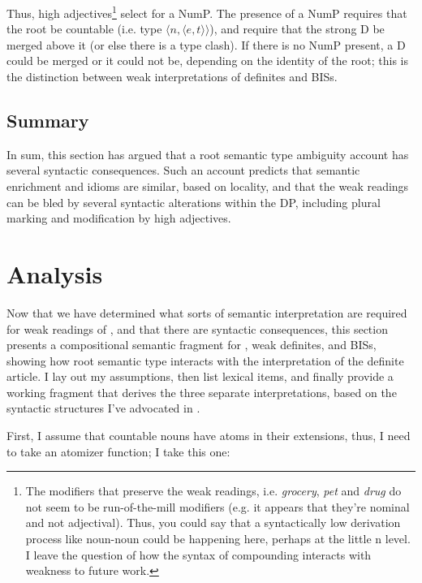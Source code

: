 \documentclass[output=paper,
modfonts
]{langscibook}
\begin{document}
Thus, high adjectives\footnote{The modifiers that preserve the weak readings, i.e. \textit{grocery}, \textit{pet} and \textit{drug} do not seem to be run-of-the-mill
modifiers (e.g. it appears that they’re nominal and not adjectival). Thus, you could say that a syntactically low derivation process like noun-noun  could be happening here, perhaps at the little n level. I leave the question of how the syntax of compounding interacts with weakness to future work.} select for a NumP. The presence of a NumP requires that the root be countable (i.e. type $\langle n, \langle e,t \rangle \rangle$), and  require that the strong D be merged above it (or else there is a type clash). If there is no NumP present, a D could be merged or it could not be, depending on the identity of the root; this is the distinction between weak interpretations of definites and BISs. 

\subsection{Summary}

In sum, this section has argued that a root semantic type ambiguity account has several syntactic consequences. Such an account predicts that semantic enrichment and idioms are similar, based on locality, and that the weak readings can be bled by several syntactic alterations within the DP, including plural marking and modification by high adjectives.

\section{Analysis}\label{sec:williams:5}

Now that we have determined what sorts of semantic interpretation are required for weak readings of , and that there are syntactic consequences, this section presents a compositional semantic fragment for , weak definites, and BISs, showing how root semantic type interacts with the interpretation of the definite article. I lay out my assumptions, then list lexical items, and finally provide a working fragment that derives the three separate interpretations, based on the syntactic structures I've advocated in .

First, I assume that countable nouns have atoms in their extensions, thus, I need to take an atomizer function; I take this one:
\end{document}
